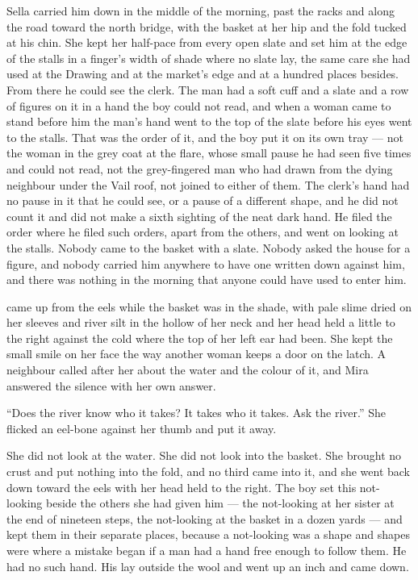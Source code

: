 Sella carried him down in the middle of the morning, past the racks and along the road toward the north bridge, with the basket at her hip and the fold tucked at his chin. She kept her half-pace from every open slate and set him at the edge of the stalls in a finger's width of shade where no slate lay, the same care she had used at the Drawing and at the market's edge and at a hundred places besides. From there he could see the clerk. The man had a soft cuff and a slate and a row of figures on it in a hand the boy could not read, and when a woman came to stand before him the man's hand went to the top of the slate before his eyes went to the stalls. That was the order of it, and the boy put it on its own tray --- not the woman in the grey coat at the flare, whose small pause he had seen five times and could not read, not the grey-fingered man who had drawn from the dying neighbour under the Vail roof, not joined to either of them. The clerk's hand had no pause in it that he could see, or a pause of a different shape, and he did not count it and did not make a sixth sighting of the neat dark hand. He filed the order where he filed such orders, apart from the others, and went on looking at the stalls. Nobody came to the basket with a slate. Nobody asked the house for a figure, and nobody carried him anywhere to have one written down against him, and there was nothing in the morning that anyone could have used to enter him.

 came up from the eels while the basket was in the shade, with pale slime dried on her sleeves and river silt in the hollow of her neck and her head held a little to the right against the cold where the top of her left ear had been. She kept the small smile on her face the way another woman keeps a door on the latch. A neighbour called after her about the water and the colour of it, and Mira answered the silence with her own answer.

“Does the river know who it takes? It takes who it takes. Ask the river.” She flicked an eel-bone against her thumb and put it away.

She did not look at the water. She did not look into the basket. She brought no crust and put nothing into the fold, and no third came into it, and she went back down toward the eels with her head held to the right. The boy set this not-looking beside the others she had given him --- the not-looking at her sister at the end of nineteen steps, the not-looking at the basket in a dozen yards --- and kept them in their separate places, because a not-looking was a shape and shapes were where a mistake began if a man had a hand free enough to follow them. He had no such hand. His lay outside the wool and went up an inch and came down.


